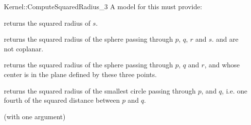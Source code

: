 \begin{ccRefFunctionObjectConcept}{Kernel::ComputeSquaredRadius_3}
A model for this must provide:


       {returns the squared radius of $s$. }

       {returns the squared radius of the sphere passing through $p$, $q$, $r$
       and $s$. \ccPrecond {} and  are not coplanar.}

       {returns the squared radius of the sphere passing through $p$, $q$ and
       $r$, and whose center is in the plane defined by these three points.}

{returns the squared radius of the smallest circle passing through $p$,
and $q$, i.e. one fourth of the squared distance between $p$ and $q$.}

\ccRefines
{} (with one argument)

\ccSeeAlso
{}\\
 \\

\end{ccRefFunctionObjectConcept}
